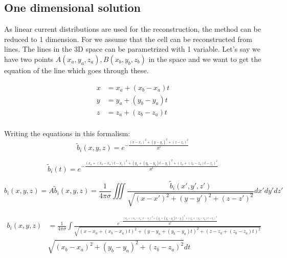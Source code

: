 \documentclass[12pt,a4paper]{article}
\begin{document}
\subsection{ One dimensional solution }
As linear current distributions are used for the reconstruction, the method can be reduced to 1 dimension. For we assume that the cell can be reconstructed from lines.
The lines in the 3D space can be parametrized with 1 variable. Let's say we have two 
points $A (x_a,y_a,z_a), B (x_b,y_b,z_b)$ in the space and we want to get the equation of the line which goes through these. 

\begin{align}
x &= x_a + (x_b - x_a) t \\
y &= y_a+(y_b-y_a)t \\
z &= z_a+(z_b-z_a)t \\
\end{align}


Writing the equations in this formalism:
\begin{equation}
\tilde{b}_i (x,y,z) = e^{- \frac{(x-x_i)^2+(y-y_i)^2+(z-z_i)^2}{R^2}}
\end{equation}

\begin{equation}
\tilde{b}_i (t) = e^{- \frac{(x_a + (x_b - x_a) t -x_i)^2+(y_a+(y_b-y_a)t-y_i)^2+( z_a+(z_b-z_a)t-z_i)^2}{R^2}}
\end{equation}



\begin{equation}
b_i (x,y,z)= A \tilde{b}_i (x,y,z)= \frac{1}{4 \pi \sigma} \iiint 
\frac{ \tilde{b}_i (x',y',z')}{\sqrt{(x-x')^2+(y-y')^2+(z-z')^2}} dx' dy' dz'
\end{equation}



\begin{align}
b_i (x,y,z) &= 
\frac{1}{4 \pi \sigma} \int 
\frac{ e^{- \frac{(x_a + (x_b - x_a) t -x_i)^2+(y_a+(y_b-y_a)t-y_i)^2+( z_a+(z_b-z_a)t-z_i)^2}{R^2}}}{\sqrt{(x-x_a + (x_b - x_a) t)^2+(y- y_a+(y_b-y_a)t )^2+(z-z_a+(z_b-z_a)t)^2}} \\
&\sqrt{(x_b-x_a)^2 +(y_b-y_a)^2+(z_b-z_a)^2} dt
\end{align}
\end{document}
